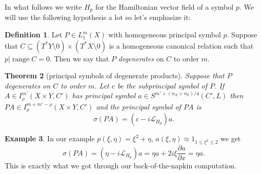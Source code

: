 \documentclass[reqno,12pt,letterpaper]{amsart}
\newcommand{\dfn}[1]{\emph{#1}\index{#1}}
\newtheorem{theorem}{Theorem}[section]
\theoremstyle{definition}
\newtheorem{definition}[theorem]{Definition}
\newtheorem{example}[theorem]{Example}
\begin{document}
In what follows we write $H_p$ for the Hamiltonian vector field of a symbol $p$.
We will use the following hypothesis a lot so let's emphasize it:

\begin{definition}
Let $P \in L^m_1(X)$ with homogeneous principal symbol $p$.
Suppose that $C \subseteq (T^*Y \setminus 0) \times (T^*X \setminus 0)$ is a homogeneous canonical relation such that $p|\operatorname{range} C = 0$.
Then we say that $P$ \dfn{degenerates} on $C$ to order $m$.
\end{definition}

\begin{theorem}[principal symbols of degenerate products]
Suppose that $P$ degenerates on $C$ to order $m$.
Let $c$ be the subprincipal symbol of $P$.
If $A \in I^{m'}_\rho(X \times Y, C')$ has principal symbol $a \in S^{m' + (n_X + n_Y)/4}(C', L)$ then $PA \in I^{m+m'-\rho}_\rho(X \times Y, C')$ and the principal symbol of $PA$ is
$$\sigma(PA) = (c - i\mathcal L_{H_p})a.$$
\end{theorem}
\begin{example}
In our example $p(\xi, \eta) = \xi^2 + \eta$, $a(\xi, \eta) \approx 1_{1 \leq \xi^2 \leq 2}$ we get
$$\sigma(PA) = (\eta - i\mathcal L_{H_p})a = \eta a + 2i\xi \frac{\partial a}{\partial x} = \eta a.$$
This is exactly what we got through our back-of-the-napkin computation.
\end{example}
\end{document}
